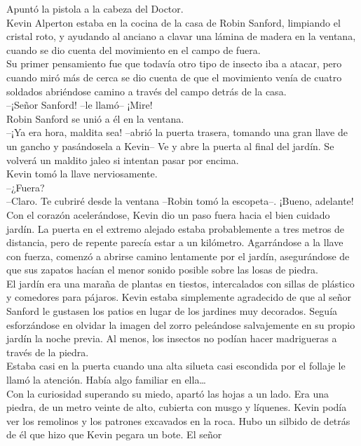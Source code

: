 Apuntó la pistola a la cabeza del Doctor.\\[2\baselineskip]Kevin
Alperton estaba en la cocina de la casa de Robin Sanford, limpiando el
cristal roto, y ayudando al anciano a clavar una lámina de madera en la
ventana, cuando se dio cuenta del movimiento en el campo de fuera.\\
Su primer pensamiento fue que todavía otro tipo de insecto iba a atacar,
pero cuando miró más de cerca se dio cuenta de que el movimiento venía
de cuatro soldados abriéndose camino a través del campo detrás de la
casa.\\
--¡Señor Sanford! --le llamó-- ¡Mire!\\
Robin Sanford se unió a él en la ventana.\\
--¡Ya era hora, maldita sea! --abrió la puerta trasera, tomando una gran
llave de un gancho y pasándosela a Kevin-- Ve y abre la puerta al final
del jardín. Se volverá un maldito jaleo si intentan pasar por encima.\\
Kevin tomó la llave nerviosamente.\\
--¿Fuera?\\
--Claro. Te cubriré desde la ventana --Robin tomó la escopeta--. ¡Bueno,
adelante!\\
Con el corazón acelerándose, Kevin dio un paso fuera hacia el bien
cuidado jardín. La puerta en el extremo alejado estaba probablemente a
tres metros de distancia, pero de repente parecía estar a un kilómetro.
Agarrándose a la llave con fuerza, comenzó a abrirse camino lentamente
por el jardín, asegurándose de que sus zapatos hacían el menor sonido
posible sobre las losas de piedra.\\
El jardín era una maraña de plantas en tiestos, intercalados con sillas
de plástico y comedores para pájaros. Kevin estaba simplemente
agradecido de que al señor Sanford le gustasen los patios en lugar de
los jardines muy decorados. Seguía esforzándose en olvidar la imagen del
zorro peleándose salvajemente en su propio jardín la noche previa. Al
menos, los insectos no podían hacer madrigueras a través de la piedra.\\
Estaba casi en la puerta cuando una alta silueta casi escondida por el
follaje le llamó la atención. Había algo familiar en ella\ldots{}\\
Con la curiosidad superando su miedo, apartó las hojas a un lado. Era
una piedra, de un metro veinte de alto, cubierta con musgo y líquenes.
Kevin podía ver los remolinos y los patrones excavados en la roca. Hubo
un silbido de detrás de él que hizo que Kevin pegara un bote. El señor
